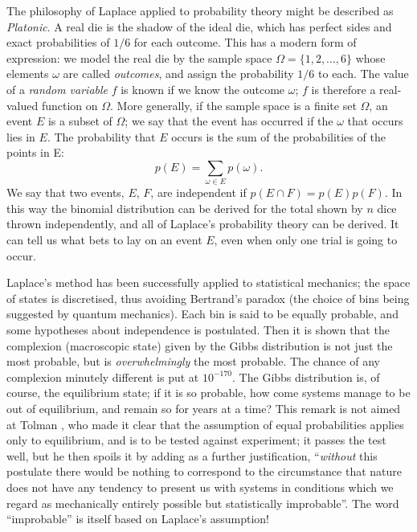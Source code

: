 \documentclass[12pt]{article}
\begin{document}
The philosophy of Laplace applied to probability theory might be described as
{\em Platonic}. A real die is the shadow of the ideal die, which has
perfect sides and exact probabilities of $1/6$ for each outcome. This
has a modern form of expression: we model the real die by the sample space
$\Omega=\{1,2,\ldots,6\}$ whose elements $\omega$ are called {\em outcomes},
and assign the probability $1/6$ to each. The value of a {\em random
variable} $f$ is known if we know the outcome $\omega$; $f$ is
therefore a real-valued function on $\Omega$.
More generally, if the sample space is a finite set $\Omega$, an event $E$
is a subset of $\Omega$; we say that the event has occurred
if the $\omega$ that occurs lies in $E$. The probability that $E$ occurs
is the sum of the probabilities of the points in E:
\begin{equation}
p(E)=\sum_{\omega\in E}p(\omega).
\end{equation}
We say that two events, $E$, $F$, are independent if $p(E\cap F)=p(E)p(F)$.
In this way the binomial distribution can be derived for the total shown
by $n$ dice thrown independently, and all of Laplace's probability theory
can be derived. It can tell us what bets to lay on an event $E$, even
when only one trial is going to occur.

Laplace's method has been
successfully applied to statistical mechanics; the space of states is
discretised, thus avoiding Bertrand's paradox (the choice of
bins being suggested by quantum mechanics). Each bin is said to be
equally probable, and some hypotheses about independence is postulated.
Then it is shown that the complexion (macroscopic state) given by the
Gibbs distribution is not just the most probable, but is {\em
overwhelmingly} the most probable. The chance of any complexion minutely
different is put at $10^{-170}$. The Gibbs distribution is, of course,
the equilibrium state; if it is so probable, how come systems manage to
be out of equilibrium, and remain so for years at a time? This remark
is not aimed at Tolman \cite{Tolman}, who made it clear that the assumption
of equal probabilities applies only to equilibrium, and is to be tested
against experiment; it passes the test well, but he then spoils it by adding
as a further justification, ``{\em without} this
postulate there would be nothing to correspond to the circumstance that
nature does not have any tendency to present us with systems in conditions 
which we regard as mechanically entirely possible but statistically
improbable''. The word ``improbable'' is itself based on Laplace's
assumption!
\end{document}
